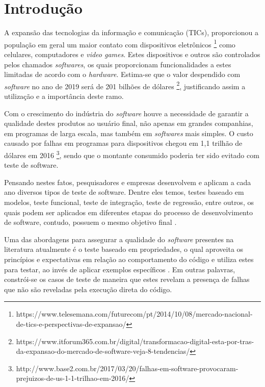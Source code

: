 \section{Introdução}\label{sec:introducao}
	
	A expansão das tecnologias da informação e comunicação (TICs), proporcionou a população em geral um maior contato com dispositivos eletrônicos \footnote{https://www.telesemana.com/futurecom/pt/2014/10/08/mercado-nacional-de-tics-e-perspectivas-de-expansao/} como celulares, computadores e \textit{video games}. Estes dispositivos e outros são controlados pelos chamados \textit{softwares}, os quais proporcionam funcionalidades a estes limitadas de acordo com o \textit{hardware}. Estima-se que o valor despendido com \textit{software} no ano de 2019 será de 201 bilhões de dólares \footnote{https://www.itforum365.com.br/digital/transformacao-digital-esta-por-tras-da-expansao-do-mercado-de-software-veja-8-tendencias/}, justificando assim a utilização e a importância deste ramo.

	Com o crescimento do indústria do \textit{software} houve a necessidade de garantir a qualidade destes produtos ao usuário final, não apenas em grandes companhias, em programas de larga escala, mas também em \textit{softwares} mais simples. O custo causado por falhas em programas para dispositivos chegou em 1,1 trilhão de dólares em 2016 \footnote{http://www.base2.com.br/2017/03/20/falhas-em-software-provocaram-prejuizos-de-us-1-1-trilhao-em-2016/}, sendo que o montante consumido poderia ter sido evitado com teste de software.

	Pensando nestes fatos, pesquisadores e empresas desenvolvem e aplicam a cada ano diversos tipos de teste de software. Dentre eles temos, testes baseado em modelos, teste funcional, teste de integração, teste de regressão, entre outros, os quais podem ser aplicados em diferentes etapas do processo de desenvolvimento de software, contudo, possuem o mesmo objetivo final \cite{paiva2016aplicaccao}.

	Uma das abordagens para assegurar a qualidade do \textit{software} presentes na literatura atualmente é o teste baseado em propriedades, o qual aproveita os princípios e expectativas em relação ao comportamento do código e utiliza estes para testar, ao invés de aplicar exemplos específicos \cite{fink1997property}. Em outras palavras, constrói-se os casos de teste de maneira que estes revelam a presença de falhas que não são reveladas pela execução direta do código. 

